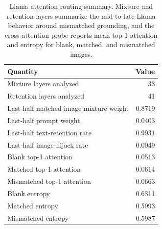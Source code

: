\documentclass{article}
\begin{document}
\begin{table}[!htbp]
\centering
\caption{Llama attention routing summary. Mixture and retention layers summarize the mid-to-late Llama behavior around mismatched grounding, and the cross-attention probe reports mean top-1 attention and entropy for blank, matched, and mismatched images.}
\label{tab:llama_attention_routing}
\small
\begin{tabular}{lr}
\toprule
Quantity & Value \\
\midrule
Mixture layers analyzed & 33 \\
Retention layers analyzed & 41 \\
Last-half matched-image mixture weight & 0.8719 \\
Last-half prompt weight & 0.0403 \\
Last-half text-retention rate & 0.9931 \\
Last-half image-hijack rate & 0.0049 \\
\midrule
Blank top-1 attention & 0.0513 \\
Matched top-1 attention & 0.0614 \\
Mismatched top-1 attention & 0.0663 \\
Blank entropy & 0.6311 \\
Matched entropy & 0.5993 \\
Mismatched entropy & 0.5987 \\
\bottomrule
\end{tabular}
\end{table}

\begin{table}[!htbp]
\centering
\caption{Llama attention-to-geometry coupling. More selective matched-image routing is associated with less RDM disruption, but the coupling does not fully translate into external reference-space alignment.}
\label{tab:llama_attention_geometry}
\small
{}
\end{table}
\end{document}
